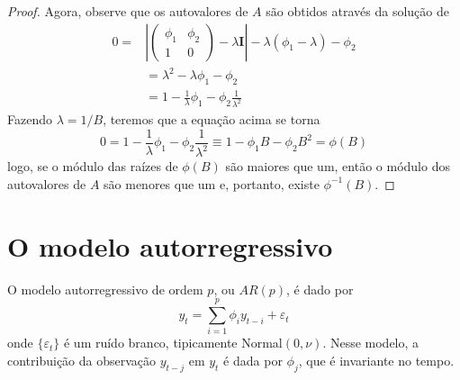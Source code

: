 \documentclass[
  letterpaper,
  DIV=11,
  numbers=noendperiod]{scrartcl}
\theoremstyle{definition}
\theoremstyle{definition}
\theoremstyle{plain}
\theoremstyle{plain}
\theoremstyle{remark}
\begin{document}
\begin{proof}
Agora, observe que os autovalores de \(A\) são obtidos através da
solução de\\
\begin{align}0=&\left|\left(\begin{array}{cc}\phi_1 & \phi_2 \\ 1 & 0\end{array}\right)-\lambda \textbf{I}\right|-\lambda(\phi_1-\lambda)-\phi_2\\&=\lambda^2-\lambda \phi_1-\phi_2\\
&=1-\frac{1}{\lambda}\phi_1-\phi_2\frac{1}{\lambda^2}\end{align} Fazendo
\(\lambda = 1/B\), teremos que a equação acima se torna
\[0=1-\frac{1}{\lambda}\phi_1-\phi_2\frac{1}{\lambda^2}\equiv 1-\phi_1 B-\phi_2B^2=\phi(B)\]
logo, se o módulo das raízes de \(\phi(B)\) são maiores que um, então o
módulo dos autovalores de \(A\) são menores que um e, portanto, existe
\(\phi^{-1}(B)\).
\end{proof}

\section{O modelo autorregressivo}\label{o-modelo-autorregressivo}

O modelo autorregressivo de ordem \(p\), ou \(AR(p)\), é dado por
\begin{equation}
        y_t = \sum_{i=1}^{p}\phi_iy_{t-i} +\varepsilon_t
\end{equation} onde \(\{\varepsilon_t\}\) é um ruído branco, tipicamente
Normal\((0,\nu)\). Nesse modelo, a contribuição da observação
\(y_{t-j}\) em \(y_t\) é dada por \(\phi_j\), que é invariante no tempo.
\end{document}
